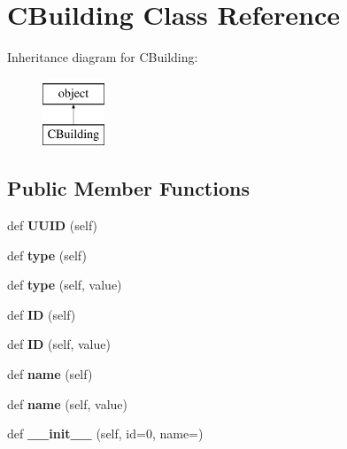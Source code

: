 \hypertarget{class_c_building_1_1_c_building}{}\section{C\+Building Class Reference}
\label{class_c_building_1_1_c_building}
Inheritance diagram for C\+Building\+:\begin{figure}[H]
\begin{center}
\leavevmode
\includegraphics[height=2.000000cm]{class_c_building_1_1_c_building}
\end{center}
\end{figure}
\subsection*{Public Member Functions}
\begin{DoxyCompactItemize}
\item 
\mbox{\label{class_c_building_1_1_c_building_abbcfc1a774079da020e49c42cbadb693}} 
def {\bfseries U\+U\+ID} (self)
\item 
\mbox{\label{class_c_building_1_1_c_building_aff464267544e4efc9b770c8320c8f199}} 
def {\bfseries type} (self)
\item 
\mbox{\label{class_c_building_1_1_c_building_aca033702f187894894d3102de41d6b99}} 
def {\bfseries type} (self, value)
\item 
\mbox{\label{class_c_building_1_1_c_building_adb8818239148d2e5c5833a2b062ee9ad}} 
def {\bfseries ID} (self)
\item 
\mbox{\label{class_c_building_1_1_c_building_a0a178fbcae3f6431733dd63ee37ac7bb}} 
def {\bfseries ID} (self, value)
\item 
\mbox{\label{class_c_building_1_1_c_building_a5907ca3bbf8e7cd8f40c3007338f6d02}} 
def {\bfseries name} (self)
\item 
\mbox{\label{class_c_building_1_1_c_building_a62d212fdcbbcee30e90a64ce349d32f8}} 
def {\bfseries name} (self, value)
\item 
\mbox{\label{class_c_building_1_1_c_building_aaf00860c69345f71509aa2520eb5bfa7}} 
def {\bfseries \+\_\+\+\_\+init\+\_\+\+\_\+} (self, id=0, name=\textquotesingle{}\textquotesingle{})
\end{DoxyCompactItemize}


